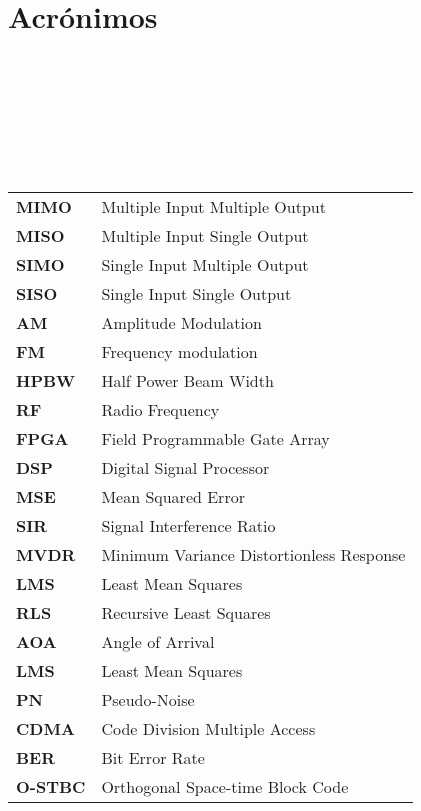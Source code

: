 \chapter{Acrónimos}

\

\

\

\

\begin{longtable}{ll}
\textbf{MIMO}   & Multiple Input Multiple Output              \\
\textbf{MISO}   & Multiple Input Single Output                \\
\textbf{SIMO}   & Single Input Multiple Output                \\
\textbf{SISO}   & Single Input Single Output                  \\
\textbf{AM}     & Amplitude Modulation                        \\
\textbf{FM}     & Frequency modulation                        \\
\textbf{HPBW}   & Half Power Beam Width                       \\
\textbf{RF}     & Radio Frequency                             \\
\textbf{FPGA}   & Field Programmable Gate Array               \\
\textbf{DSP}    & Digital Signal Processor                    \\
\textbf{MSE}    & Mean Squared Error                          \\
\textbf{SIR}    & Signal Interference Ratio                   \\
\textbf{MVDR}   & Minimum Variance Distortionless Response    \\
\textbf{LMS}    & Least Mean Squares                          \\
\textbf{RLS}    & Recursive Least Squares                     \\
\textbf{AOA}    & Angle of Arrival                            \\
\textbf{LMS}    & Least Mean Squares                          \\
\textbf{PN}     & Pseudo-Noise                                \\
\textbf{CDMA}   & Code Division Multiple Access               \\
\textbf{BER}    & Bit Error Rate                              \\
\textbf{O-STBC} & Orthogonal Space-time Block Code            \\

\end{longtable}
